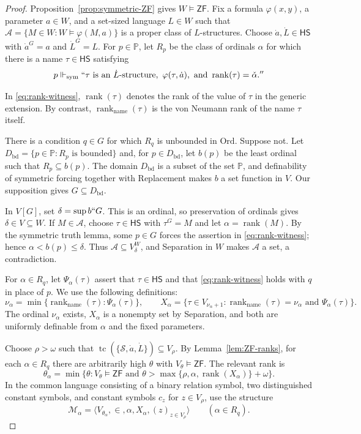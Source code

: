 \documentclass[10pt,a4paper]{amsart}
\newcommand{\HS}{\mathsf{HS}}
\newcommand{\Ord}{\mathrm{Ord}}
\newcommand{\ZF}{\mathsf{ZF}}
\newcommand{\forcesS}{\Vdash_{\mathrm{sym}}}
\newcommand{\namerank}{\operatorname{rank}_{\mathrm{name}}}
\newcommand{\rank}{\operatorname{rank}}
\newcommand{\tc}{\operatorname{tc}}
\begin{document}
\begin{proof}

Proposition~\ref{prop:symmetric-ZF} gives $W\models\ZF$.  Fix a formula $\varphi(x,y)$, a parameter $a\in W$, and a set-sized language $L\in W$ such that
$\mathcal A=\{M\in W:W\models\varphi(M,a)\}$ is a proper class of $L$-structures.  Choose $\dot a,\dot L\in\HS$ with $\dot a^G=a$ and $\dot L^G=L$.  For $p\in\mathbb P$, let $R_p$ be the class of ordinals $\alpha$ for which there is a name $\tau\in\HS$ satisfying
\begin{equation}\label{eq:rank-witness}
p\forcesS ``\tau\text{ is an }\dot L\text{-structure},\ \varphi(\tau,\dot a),
\text{ and }\rank(\tau)=\check\alpha.''
\end{equation}

{In \eqref{eq:rank-witness}, $\rank(\tau)$ denotes the rank of the value of $\tau$ in the generic extension.  By contrast, $\namerank(\tau)$ is the von Neumann rank of the name $\tau$ itself.}

There is a condition $q\in G$ for which $R_q$ is unbounded in $\Ord$.  Suppose not.  Let $D_{\mathrm{bd}}=\{p\in\mathbb P:R_p\text{ is bounded}\}$ and, for $p\in D_{\mathrm{bd}}$, let $b(p)$ be the least ordinal such that $R_p\subseteq b(p)$.  The domain $D_{\mathrm{bd}}$ is a subset of the set $\mathbb P$, and definability of symmetric forcing together with Replacement makes $b$ a set function in $V$.  Our supposition gives $G\subseteq D_{\mathrm{bd}}$.

In $V[G]$, set $\delta=\sup b``G$.  This is an ordinal, so preservation of ordinals gives $\delta\in V\subseteq W$.  If $M\in\mathcal A$, choose $\tau\in\HS$ with $\tau^G=M$ and let $\alpha=\rank(M)$.  By the symmetric truth lemma, some $p\in G$ forces the assertion in \eqref{eq:rank-witness}; hence $\alpha<b(p)\leq\delta$.  Thus $\mathcal A\subseteq V_\delta^W$, and Separation in $W$ makes $\mathcal A$ a set, a contradiction.

For $\alpha\in R_q$, let $\Psi_\alpha(\tau)$ assert that $\tau\in\HS$ and that \eqref{eq:rank-witness} holds with $q$ in place of $p$.  We use the following definitions:
\[
\nu_\alpha=\min\{\namerank(\tau):\Psi_\alpha(\tau)\},
\qquad
X_\alpha=\{\tau\in V_{\nu_\alpha+1}:\namerank(\tau)=\nu_\alpha
\text{ and }\Psi_\alpha(\tau)\}.
\]
{The ordinal $\nu_\alpha$ exists, $X_\alpha$ is a nonempty set by Separation, and both are uniformly definable from $\alpha$ and the fixed parameters.}

Choose $\rho>\omega$ such that $\tc(\{\mathscr S,\dot a,\dot L\})\subseteq V_\rho$.  By Lemma~\ref{lem:ZF-ranks}, for each $\alpha\in R_q$ there are arbitrarily high $\theta$ with $V_\theta\models\ZF$.  The relevant rank is
\[
\theta_\alpha=\min\bigl\{\theta:V_\theta\models\ZF\text{ and }
\theta>\max\{\rho,\alpha,\rank(X_\alpha)\}+\omega\bigr\}.
\]
In the common language consisting of a binary relation symbol, two distinguished constant symbols, and constant symbols $c_z$ for $z\in V_\rho$, use the structure
\[
\mathcal M_\alpha=
\bigl\langle V_{\theta_\alpha},\in,\alpha,X_\alpha,(z)_{z\in V_\rho}\bigr\rangle
\qquad(\alpha\in R_q).
\]


\end{proof}
\end{document}
